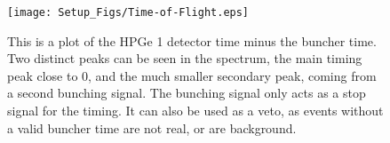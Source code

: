 \begin{figure}
    \centering
    \texttt{[image: Setup\_Figs/Time-of-Flight.eps]}
    \caption{This is a plot of the HPGe 1 detector time minus the buncher time. Two distinct peaks can be seen in the spectrum, the main timing peak close to 0, and the much smaller secondary peak, coming from a second bunching signal. The bunching signal only acts as a stop signal for the timing. It can also be used as a veto, as events without a valid buncher time are not real, or are background.}
    \label{fig:bunched}
\end{figure}